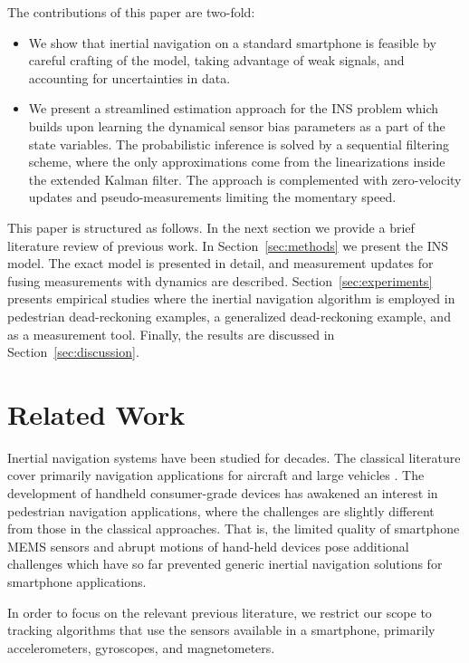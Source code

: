 \documentclass[conference]{ieeetran}
\begin{document}
The contributions of this paper are two-fold: 
\begin{itemize}
  \item We show that inertial navigation on a standard smartphone is feasible by careful crafting of the model, taking advantage of weak signals, and accounting for uncertainties in data.
  \item We present a streamlined estimation approach for the INS problem which builds upon learning the dynamical sensor bias parameters as a part of the state variables. The probabilistic inference is solved by a sequential filtering scheme, where the only approximations come from the linearizations inside the extended Kalman filter. The approach is complemented with zero-velocity updates and pseudo-measurements limiting the momentary speed. 
\end{itemize} 

This paper is structured as follows. In the next section we provide a brief literature review of previous work. In Section~\ref{sec:methods} we present the INS model. The exact model is presented in detail, and measurement updates for fusing measurements with dynamics are described. Section~\ref{sec:experiments} presents empirical studies where the inertial navigation algorithm is employed in pedestrian dead-reckoning examples, a generalized dead-reckoning example, and as a measurement tool.  Finally, the results are discussed in Section~\ref{sec:discussion}.



\section{Related Work}
\label{sec:literature}
\noindent
Inertial navigation systems have been studied for decades. The classical literature cover primarily navigation applications for aircraft and large vehicles \cite{Jekeli:2001,Bar-Shalom+Li+Kirubarajan:2001,Titterton+Weston:2004,Britting:2010}. The development of handheld consumer-grade devices has awakened an interest in pedestrian navigation applications, where the challenges are slightly different from those in the classical approaches. That is, the limited quality of smartphone MEMS sensors and abrupt motions of hand-held devices pose additional challenges which have so far prevented generic inertial navigation solutions for smartphone applications.


In order to focus on the relevant previous literature, we restrict our scope to tracking algorithms that use the sensors available in a smartphone, primarily accelerometers, gyroscopes, and magnetometers.
\end{document}
